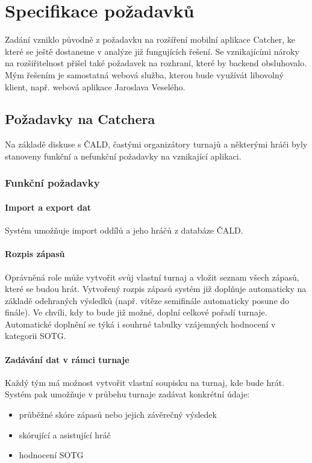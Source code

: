 \chapter{Specifikace požadavků}

Zadání vzniklo původně z požadavku na rozšíření mobilní aplikace Catcher, ke které se ještě
dostaneme v analýze již fungujících řešení. Se vznikajícími nároky na rozšiřitelnost přišel
také požadavek na rozhraní, které by backend obsluhovalo. Mým řešením je samostatná webová
služba, kterou bude využívát libovolný klient, např. webová aplikace Jaroslava Veselého. 

\section{Požadavky na Catchera}

Na základě diskuse s ČALD, častými organizátory turnajů a některými hráči byly stanoveny
funkční a nefunkční požadavky na vznikající aplikaci.

\subsection{Funkční požadavky}

\subsubsection*{Import a export dat}
Systém umožňuje import oddílů a jeho hráčů z databáze ČALD.

\subsubsection*{Rozpis zápasů}
Oprávněná role může vytvořit svůj vlastní turnaj a vložit seznam všech zápasů,
které se budou hrát. Vytvořený rozpis zápasů systém již doplňuje automaticky na základě
odehraných výsledků (např. vítěze semifinále automaticky posune do finále). Ve chvíli,
kdy to bude již možné, doplní celkové pořadí turnaje. Automatické doplnění se týká i 
souhrné tabulky vzájemných hodnocení v kategorii SOTG.

\subsubsection*{Zadávání dat v rámci turnaje}
Každý tým má možnost vytvořit vlastní soupisku na turnaj, kde bude hrát. Systém pak umožňuje
v průbehu turnaje zadávat konkrétní údaje:
\begin{itemize}
  \item průběžné skóre zápasů nebo jejich závěrečný výsledek
  \item skórující a asistující hráč
  \item hodnocení SOTG
\end{itemize}


